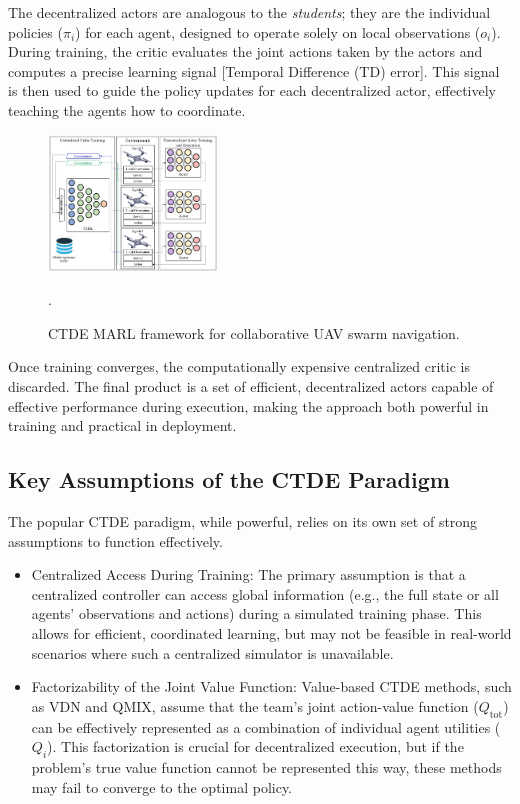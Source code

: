 The decentralized actors are analogous to the \textit{students}; they are the individual policies ($\pi_i$) for each agent, designed to operate solely on local observations ($o_i$). During training, the critic evaluates the joint actions taken by the actors and computes a precise learning signal [Temporal Difference (TD) error]. This signal is then used to guide the policy updates for each decentralized actor, effectively teaching the agents how to coordinate.
\begin{figure}[hbt!]
    \centering
     \includegraphics[width=0.4\textwidth]{img_pfe/ctde.jpeg}
    \caption{CTDE MARL framework for collaborative UAV swarm navigation.
   \parencite{swarm_navigation_ctde} }.
    \label{fig:ctde}
\end{figure}

Once training converges, the computationally expensive centralized critic is discarded. The final product is a set of efficient, decentralized actors capable of effective performance during execution, making the approach both powerful in training and practical in deployment.

\subsection{Key Assumptions of the CTDE Paradigm}
The popular CTDE paradigm, while powerful, relies on its own set of strong assumptions to function effectively.
\begin{itemize}
  \item Centralized Access During Training: The primary assumption is that a centralized controller can access global information (e.g., the full state or all agents' observations and actions) during a simulated training phase. This allows for efficient, coordinated learning, but may not be feasible in real-world scenarios where such a centralized simulator is unavailable.
    \item Factorizability of the Joint Value Function: Value-based CTDE methods, such as VDN and QMIX, assume that the team's joint action-value function ($Q_{\text{tot}}$) can be effectively represented as a combination of individual agent utilities ($Q_i$). This factorization is crucial for decentralized execution, but if the problem's true value function cannot be represented this way, these methods may fail to converge to the optimal policy.
\end{itemize}


